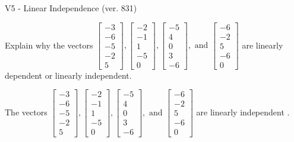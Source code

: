 \begin{exercise}
  \begin{exerciseTitle}V5 - Linear Independence (ver. 831)\end{exerciseTitle}
  \begin{exerciseStatement}
    Explain why the vectors \(\left[\begin{array}{r}
-3 \\
-6 \\
-5 \\
-2 \\
5
\end{array}\right] , \left[\begin{array}{r}
-2 \\
-1 \\
1 \\
-5 \\
0
\end{array}\right] , \left[\begin{array}{r}
-5 \\
4 \\
0 \\
3 \\
-6
\end{array}\right] , \text{ and } \left[\begin{array}{r}
-6 \\
-2 \\
5 \\
-6 \\
0
\end{array}\right]\) are linearly dependent or linearly independent.	


  \end{exerciseStatement}
  \begin{exerciseAnswer}
   The vectors \(\left[\begin{array}{r}
-3 \\
-6 \\
-5 \\
-2 \\
5
\end{array}\right] , \left[\begin{array}{r}
-2 \\
-1 \\
1 \\
-5 \\
0
\end{array}\right] , \left[\begin{array}{r}
-5 \\
4 \\
0 \\
3 \\
-6
\end{array}\right] , \text{ and } \left[\begin{array}{r}
-6 \\
-2 \\
5 \\
-6 \\
0
\end{array}\right]\) are 
  	 linearly independent  .
  


  \end{exerciseAnswer}
\end{exercise}